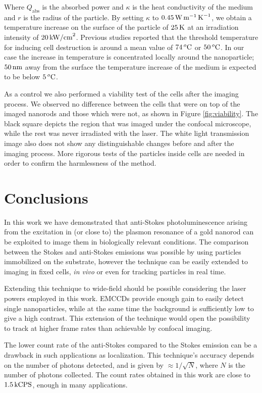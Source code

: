 Where $Q_\textrm{abs}$ is the absorbed power and $\kappa$ is the heat
conductivity of the medium and $r$ is the radius of the particle. By setting
$\kappa$ to $0.45\,\textrm{W}\,\textrm{m}^{-1}\,\textrm{K}^{-1}$\cite{Sturesson1995}, we obtain a
temperature increase on the surface of the particle of $25\,\textrm{K}$ at an irradiation
intensity of $20\,\textrm{kW/cm}^2$. Previous studies reported that the threshold temperature
for inducing cell destruction is around a mean value of
$74\,^o\textrm{C}$\cite{Huang2006a} or $50\,^o\textrm{C}$\cite{ONeal2004}. In our case the
increase in temperature is concentrated locally around the nanoparticle; $50\,\textrm{nm}$
away from the surface the temperature increase of the medium is expected to be
below $5\,^o\textrm{C}$.

As a control we also performed a viability test of the cells after the
imaging process. We observed no difference between the cells that were on
top of the imaged nanorods and those which were not, as shown in Figure
\ref{fig:viability}. The black square depicts the region that was imaged under
the confocal microscope, while the rest was never irradiated with the laser.
The white light transmission image also does not show any distinguishable
changes before and after the imaging process. More rigorous tests of the
particles inside cells are needed in order to confirm the harmlessness of the
method.

\section{Conclusions}
In this work we have demonstrated that anti-Stokes photoluminescence arising
from the excitation in (or close to) the plasmon resonance of a gold nanorod can
be exploited to image them in biologically relevant conditions\cite{Jiang2013}.
The comparison between the Stokes and anti-Stokes emissions was possible by
using particles immobilized on the substrate, however the technique can
be easily extended to imaging in fixed cells, \textit{in vivo} or even for
tracking particles in real time\cite{VandenBroek2013}.

Extending this technique to wide-field should be possible considering the laser
powers employed in this work. EMCCDs provide enough gain\cite{Dussault2004} to
easily detect single nanoparticles, while at the same time the background is
sufficiently low to give a high contrast. This extension of the technique would
open the possibility to track at higher frame rates than achievable by
confocal imaging.

The lower count rate of the anti-Stokes compared to the Stokes emission can be a
drawback in such applications as localization\cite{Sahl2013}. This technique's
accuracy depends on the number of photons detected, and is given by $\approx
1/\sqrt{N}$, where $N$ is the number of photons collected. The count rates
obtained in this work are close to $1.5\,\textrm{kCPS}$, enough in many applications.

